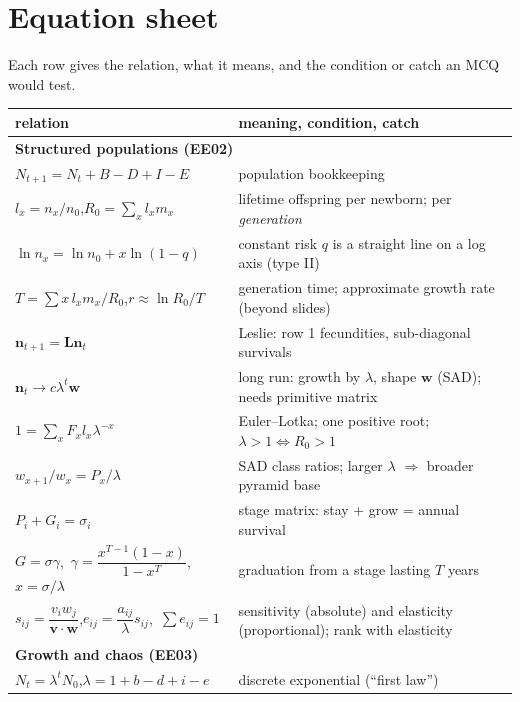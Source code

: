 \section{Equation sheet}\label{sec:equations}
Each row gives the relation, what it means, and the condition or catch an MCQ would test.

{\small
\renewcommand{\arraystretch}{1.45}
\begin{longtable}{p{}p{}}
\toprule
relation & meaning, condition, catch\\\midrule
\endhead
\multicolumn{2}{l}{\textbf{Structured populations (EE02)}}\\
$N_{t+1}=N_t+B-D+I-E$ & population bookkeeping\\
$l_x=n_x/n_0$,\quad $R_0=\sum_x l_xm_x$ & lifetime offspring per newborn; per \emph{generation}\\
$\ln n_x=\ln n_0+x\ln(1-q)$ & constant risk $q$ is a straight line on a log axis (type II)\\
$T=\sum x\,l_xm_x/R_0$,\quad $r\approx\ln R_0/T$ & generation time; approximate growth rate (beyond slides)\\
$\mathbf n_{t+1}=\mathbf L\mathbf n_t$ & Leslie: row 1 fecundities, sub-diagonal survivals\\
$\mathbf n_t\to c\lambda^t\mathbf w$ & long run: growth by $\lambda$, shape $\mathbf w$ (SAD); needs primitive matrix\\
$1=\sum_x F_xl_x\lambda^{-x}$ & Euler--Lotka; one positive root; $\lambda>1\iff R_0>1$\\
$w_{x+1}/w_x=P_x/\lambda$ & SAD class ratios; larger $\lambda$ $\Rightarrow$ broader pyramid base\\
$P_i+G_i=\sigma_i$ & stage matrix: stay + grow = annual survival\\
$G=\sigma\gamma$,\ $\gamma=\dfrac{x^{T-1}(1-x)}{1-x^T}$,\ $x=\sigma/\lambda$ & graduation from a stage lasting $T$ years\\
$s_{ij}=\dfrac{v_iw_j}{\mathbf v\cdot\mathbf w}$,\quad $e_{ij}=\dfrac{a_{ij}}{\lambda}s_{ij}$,\ $\sum e_{ij}=1$ & sensitivity (absolute) and elasticity (proportional); rank with elasticity\\
\midrule
\multicolumn{2}{l}{\textbf{Growth and chaos (EE03)}}\\
$N_t=\lambda^tN_0$,\quad $\lambda=1+b-d+i-e$ & discrete exponential (``first law'')\\

\end{longtable}}
